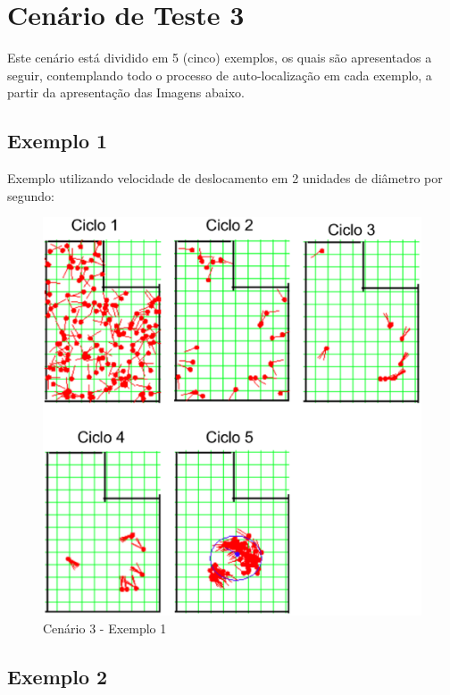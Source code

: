 \section{Cenário de Teste 3}

Este cenário está dividido em 5 (cinco) exemplos, os quais são apresentados a seguir, contemplando todo o processo de auto-localização
em cada exemplo, a partir da apresentação das Imagens abaixo.

\subsection{Exemplo 1}

Exemplo utilizando velocidade de deslocamento em 2 unidades de diâmetro por segundo:

\begin{figure}[H]
  \centering
  \includegraphics[scale=0.4]{figuras/cen3_ex1.eps}
  \caption[Cenário 3 - Exemplo 1]{Cenário 3 - Exemplo 1}
  \label{img:cen3_ex1}
\end{figure}


\subsection{Exemplo 2}

